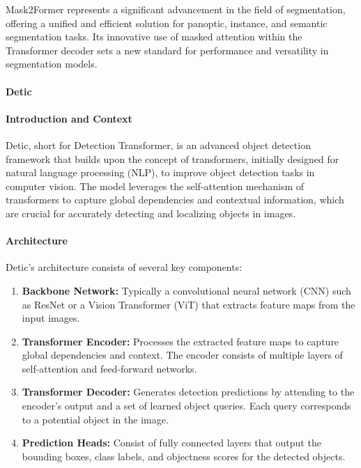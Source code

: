 \documentclass[12pt]{article}
\begin{document}
Mask2Former represents a significant advancement in the field of segmentation, offering a unified and efficient solution for panoptic, instance, and semantic segmentation tasks. Its innovative use of masked attention within the Transformer decoder sets a new standard for performance and versatility in segmentation models.

\paragraph{Detic}

\paragraph{Introduction and Context}
Detic, short for Detection Transformer, is an advanced object detection framework that builds upon the concept of transformers, initially designed for natural language processing (NLP), to improve object detection tasks in computer vision. The model leverages the self-attention mechanism of transformers to capture global dependencies and contextual information, which are crucial for accurately detecting and localizing objects in images.

\paragraph{Architecture}
Detic's architecture consists of several key components:
\begin{enumerate}
    \item \textbf{Backbone Network:} Typically a convolutional neural network (CNN) such as ResNet or a Vision Transformer (ViT) that extracts feature maps from the input images.
    \item \textbf{Transformer Encoder:} Processes the extracted feature maps to capture global dependencies and context. The encoder consists of multiple layers of self-attention and feed-forward networks.
    \item \textbf{Transformer Decoder:} Generates detection predictions by attending to the encoder's output and a set of learned object queries. Each query corresponds to a potential object in the image.
    \item \textbf{Prediction Heads:} Consist of fully connected layers that output the bounding boxes, class labels, and objectness scores for the detected objects.
\end{enumerate}
\end{document}
